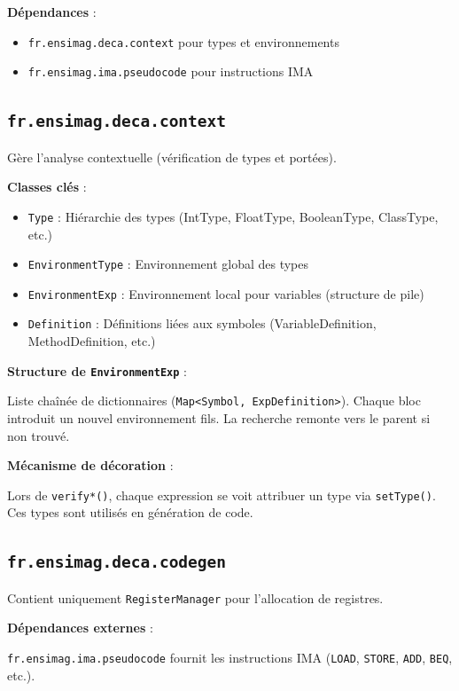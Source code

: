 \documentclass[12pt,a4paper]{article}
\begin{document}
\textbf{Dépendances} :

\begin{itemize}[itemsep=0.2em]
    \item \texttt{fr.ensimag.deca.context} pour types et environnements
    \item \texttt{fr.ensimag.ima.pseudocode} pour instructions IMA
\end{itemize}

\subsection{\texttt{fr.ensimag.deca.context}}

Gère l'analyse contextuelle (vérification de types et portées).

\textbf{Classes clés} :

\begin{itemize}[itemsep=0.2em]
    \item \texttt{Type} : Hiérarchie des types (IntType, FloatType, BooleanType, ClassType, etc.)
    \item \texttt{EnvironmentType} : Environnement global des types
    \item \texttt{EnvironmentExp} : Environnement local pour variables (structure de pile)
    \item \texttt{Definition} : Définitions liées aux symboles (VariableDefinition, MethodDefinition, etc.)
\end{itemize}

\textbf{Structure de \texttt{EnvironmentExp}} :

Liste chaînée de dictionnaires (\texttt{Map<Symbol, ExpDefinition>}). Chaque bloc introduit un nouvel environnement fils. La recherche remonte vers le parent si non trouvé.

\textbf{Mécanisme de décoration} :

Lors de \texttt{verify*()}, chaque expression se voit attribuer un type via \texttt{setType()}. Ces types sont utilisés en génération de code.

\subsection{\texttt{fr.ensimag.deca.codegen}}

Contient uniquement \texttt{RegisterManager} pour l'allocation de registres.

\textbf{Dépendances externes} :

\texttt{fr.ensimag.ima.pseudocode} fournit les instructions IMA (\texttt{LOAD}, \texttt{STORE}, \texttt{ADD}, \texttt{BEQ}, etc.).
\end{document}
